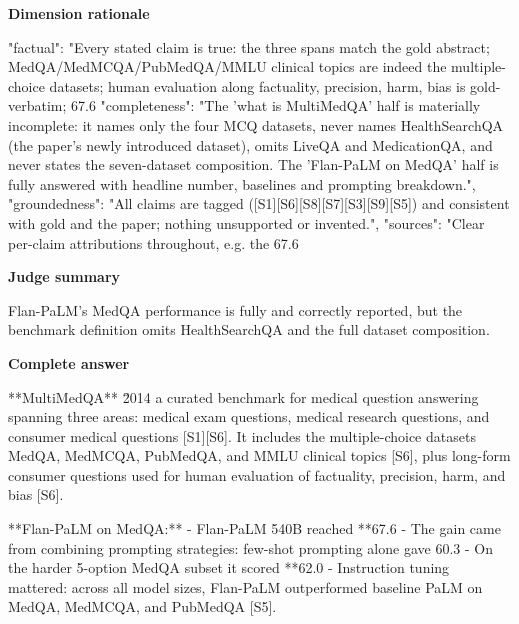 \documentclass[10pt]{article}
\begin{document}
\textbf{Dimension rationale}
\begin{EvidenceText}
{
  "factual": "Every stated claim is true: the three spans match the gold abstract; MedQA/MedMCQA/PubMedQA/MMLU clinical topics are indeed the multiple-choice datasets; human evaluation along factuality, precision, harm, bias is gold-verbatim; 67.6%
  "completeness": "The 'what is MultiMedQA' half is materially incomplete: it names only the four MCQ datasets, never names HealthSearchQA (the paper's newly introduced dataset), omits LiveQA and MedicationQA, and never states the seven-dataset composition. The 'Flan-PaLM on MedQA' half is fully answered with headline number, baselines and prompting breakdown.",
  "groundedness": "All claims are tagged ([S1][S6][S8][S7][S3][S9][S5]) and consistent with gold and the paper; nothing unsupported or invented.",
  "sources": "Clear per-claim attributions throughout, e.g. the 67.6%
}
\end{EvidenceText}

\textbf{Judge summary}
\begin{EvidenceText}
Flan-PaLM's MedQA performance is fully and correctly reported, but the benchmark definition omits HealthSearchQA and the full dataset composition.
\end{EvidenceText}

\textbf{Complete answer}
\begin{AnswerText}
**MultiMedQA** \u2014 a curated benchmark for medical question answering spanning three areas: medical exam questions, medical research questions, and consumer medical questions [S1][S6]. It includes the multiple-choice datasets MedQA, MedMCQA, PubMedQA, and MMLU clinical topics [S6], plus long-form consumer questions used for human evaluation of factuality, precision, harm, and bias [S6].

**Flan-PaLM on MedQA:**
- Flan-PaLM 540B reached **67.6%
- The gain came from combining prompting strategies: few-shot prompting alone gave 60.3%
- On the harder 5-option MedQA subset it scored **62.0%
- Instruction tuning mattered: across all model sizes, Flan-PaLM outperformed baseline PaLM on MedQA, MedMCQA, and PubMedQA [S5].
\end{AnswerText}
\end{document}
